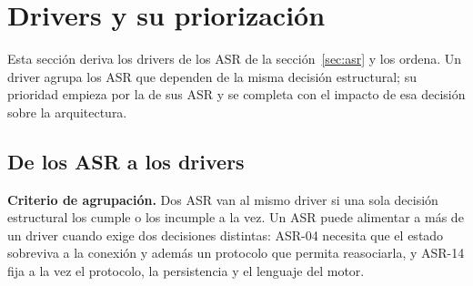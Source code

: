 \section{Drivers y su priorización}\label{sec:priorizacion}

Esta sección deriva los drivers de los ASR de la sección~\ref{sec:asr} y los ordena. Un driver agrupa los ASR que dependen de la misma decisión estructural; su prioridad empieza por la de sus ASR y se completa con el impacto de esa decisión sobre la arquitectura.

\subsection{De los ASR a los drivers}

\textbf{Criterio de agrupación.} Dos ASR van al mismo driver si una sola decisión estructural los cumple o los incumple a la vez. Un ASR puede alimentar a más de un driver cuando exige dos decisiones distintas: ASR-04 necesita que el estado sobreviva a la conexión y además un protocolo que permita reasociarla, y ASR-14 fija a la vez el protocolo, la persistencia y el lenguaje del motor.

